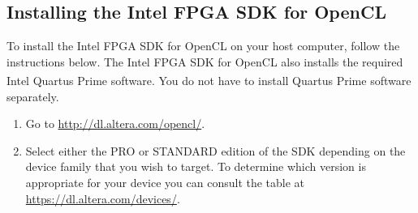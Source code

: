 \documentclass[11pt, twoside, pdftex]{article}
\begin{document}
\subsection{Installing the Intel\textsuperscript{\textregistered} FPGA SDK for OpenCL\textsuperscript{\texttrademark}}
\label{sec:install_sdk}

To install the Intel FPGA SDK for OpenCL on your host computer, follow the instructions below. The Intel FPGA SDK for OpenCL
also installs the required Intel Quartus\textsuperscript{\textregistered} Prime software. You do not have to install Quartus Prime software separately. 

\begin{enumerate}
\item Go to \url{http://dl.altera.com/opencl/}.
\item Select either the PRO or STANDARD edition of the SDK depending on the device family that you wish to target. To determine which version is appropriate for your device you can consult the table at \url{https://dl.altera.com/devices/}. 


\end{enumerate}
\end{document}
